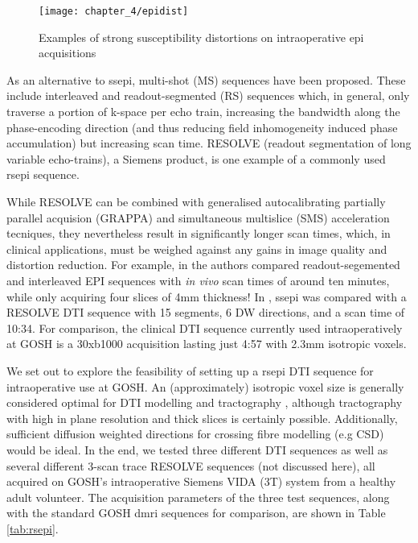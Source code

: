 \begin{figure}[h!]
  \texttt{[image: chapter\_4/epidist]}
  \caption{Examples of strong susceptibility distortions on intraoperative \gls{epi} acquisitions}
  \label{fig:epi}
\end{figure}

As an alternative to \gls{ssepi}, multi-shot (MS) sequences have been proposed.
These include interleaved and readout-segmented (RS) sequences which, in general, only traverse a portion of k-space per echo train, increasing the bandwidth along the phase-encoding direction (and thus reducing field inhomogeneity induced phase accumulation) but increasing scan time.\autocite{Wang2018}
RESOLVE (readout segmentation of long variable echo-trains), a Siemens product, is one example of a commonly used \gls{rsepi} sequence.

While RESOLVE can be combined with generalised autocalibrating partially parallel acquision (GRAPPA) and simultaneous multislice (SMS) acceleration tecniques, they nevertheless result in significantly longer scan times, which, in clinical applications, must be weighed against any gains in image quality and distortion reduction.
For example, in \textcite{Wang2018} the authors compared readout-segemented and interleaved EPI sequences with \textit{in vivo} scan times of around ten minutes, while only acquiring four slices of 4mm thickness!
In \textcite{Elliott2020}, \gls{ssepi} was compared with a RESOLVE DTI sequence with 15 segments, 6 DW directions, and a scan time of 10:34.
For comparison, the clinical DTI sequence currently used intraoperatively at GOSH is a 30xb1000 acquisition lasting just 4:57 with 2.3mm isotropic voxels.

We set out to explore the feasibility of setting up a \gls{rsepi} DTI sequence for intraoperative use at GOSH.
An (approximately) isotropic voxel size is generally considered optimal for DTI modelling and tractography \autocite{Vos2011, Neher2013}, although tractography with high in plane resolution and thick slices is certainly possible.
Additionally, sufficient diffusion weighted directions for crossing fibre modelling (e.g CSD) would be ideal.
In the end, we tested three different DTI sequences as well as several different 3-scan trace RESOLVE sequences (not discussed here), all acquired on GOSH’s intraoperative Siemens VIDA (3T) system from a healthy adult volunteer.
The acquisition parameters of the three test sequences, along with the standard GOSH \gls{dmri} sequences for comparison, are shown in Table \ref{tab:rsepi}.


